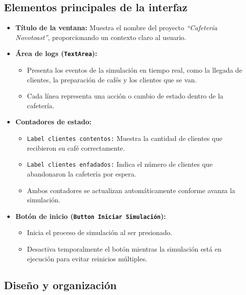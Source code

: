 \documentclass[12pt,a4paper]{article}
\begin{document}
\subsection*{Elementos principales de la interfaz}

\begin{itemize}
    \item \textbf{Título de la ventana:} Muestra el nombre del proyecto \textit{``Cafeteria Novotoast''}, proporcionando un contexto claro al usuario.
    
    \item \textbf{Área de logs (\texttt{TextArea}):} 
    \begin{itemize}
        \item Presenta los eventos de la simulación en tiempo real, como la llegada de clientes, la preparación de cafés y los clientes que se van.
        \item Cada línea representa una acción o cambio de estado dentro de la cafetería.
    \end{itemize}
    
    \item \textbf{Contadores de estado:}
    \begin{itemize}
        \item \texttt{Label clientes contentos:} Muestra la cantidad de clientes que recibieron su café correctamente.
        \item \texttt{Label clientes enfadados:} Indica el número de clientes que abandonaron la cafetería por  espera.
        \item Ambos contadores se actualizan automáticamente conforme avanza la simulación.
    \end{itemize}

    \item \textbf{Botón de inicio (\texttt{Button Iniciar Simulación}):}
    \begin{itemize}
        \item Inicia el proceso de simulación al ser presionado.
        \item Desactiva temporalmente el botón mientras la simulación está en ejecución para evitar reinicios múltiples.
    \end{itemize}
\end{itemize}

\subsection*{Diseño y organización}
\end{document}
